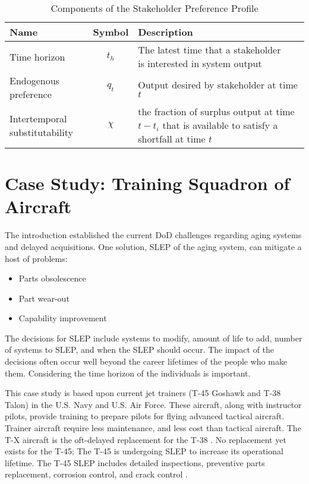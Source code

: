 \documentclass[preprint,12pt]{elsarticle}
\begin{document}
\begin{table}[h]
  \centering
  \begin{tabular}{l c l}
    \hline
    \hline
    \textbf{Name} & \textbf{Symbol} & \textbf{Description} \\
    \hline
    Time horizon &
    $t_h$ &
    \makecell[l]{The latest time that a stakeholder \\
              is interested in system output} \\
    Endogenous preference &
    $q_t$ &
    \makecell[l]{Output desired by stakeholder\\
              at time $t$} \\
    \makecell[l]{Intertemporal\\substitutability} &
    $\chi$ &
    \makecell[l]{the fraction of surplus output \\
              at time $t-t_i$ that is available \\
              to satisfy a shortfall at time $t$}\\
    \hline
  \end{tabular}
  \caption{Components of the Stakeholder Preference Profile}
  \label{t:StakeParameters}
\end{table}

\section{Case Study: Training Squadron of Aircraft}
\label{s:CaseStudy}
The introduction established the current DoD challenges regarding
aging systems and delayed acquisitions\cite{Burgess2015,LaGrone2016,awstf35}. One solution, SLEP of the
aging system, can mitigate a host of problems: 
\begin{itemize}
\item Parts obsolescence \cite{Tomczykowski2001}
\item Part wear-out \cite{jennings2018}
\item Capability improvement \cite{Burgess2015}
\end{itemize}

The decisions for SLEP include systems to modify, amount of life to add, number of
systems to SLEP, and when the SLEP should occur. The impact of the
decisions often occur well beyond the career lifetimes of the people
who make them. Considering the time horizon of the individuals is important.

This case study is based upon current jet trainers (T-45 Goshawk and
T-38 Talon) in the U.S. Navy and U.S. Air Force. These aircraft, along
with instructor pilots, provide training to prepare pilots for flying advanced tactical
aircraft. Trainer aircraft require less maintenance, and less cost
than tactical aircraft. The T-X aircraft is the
oft-delayed replacement for the T-38 \cite{Mehta2013}. No replacement
yet exists for the T-45; The T-45 is undergoing SLEP to increase its operational
lifetime. The T-45 SLEP includes detailed inspections, preventive parts 
replacement, corrosion control, and crack control \cite{jennings2018}.
\end{document}
